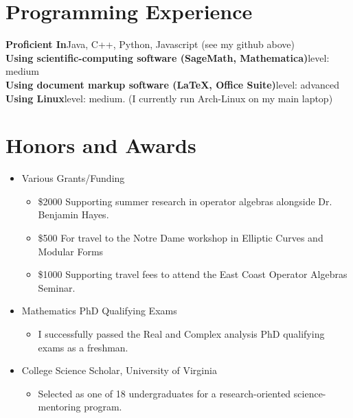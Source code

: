 \documentclass[12pt,letterpaper,sans]{moderncv}
\begin{document}
\section{Programming Experience}
\textbf{Proficient In}\quad Java, C++, Python, Javascript (see my github above) \\
\textbf{Using scientific-computing software (SageMath, Mathematica)}\quad level: medium \\
\textbf{Using document markup software (\LaTeX, Office Suite)}\quad level: advanced \\
\textbf{Using Linux}\quad level: medium. (I currently run Arch-Linux on my main laptop)

\section{Honors and Awards}
\begin{itemize}
  \item Various Grants/Funding 
  \begin{itemize}
    \item \$2000 Supporting summer research in operator algebras alongside Dr. Benjamin Hayes.
    \item \$500 For travel to the Notre Dame workshop in Elliptic Curves and Modular Forms
    \item \$1000 Supporting travel fees to attend the East Coast Operator Algebras Seminar. 
  \end{itemize}
  \item Mathematics PhD Qualifying Exams
  \begin{itemize}
    \item I successfully passed the Real and Complex analysis PhD qualifying exams as a freshman.
  \end{itemize}
  \item College Science Scholar, University of Virginia
  \begin{itemize}
    \item Selected as one of 18 undergraduates for a research-oriented science-mentoring program.
  \end{itemize}


  
\end{itemize}
\end{document}
